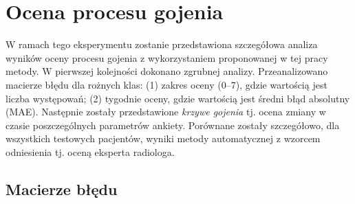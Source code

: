 \section{Ocena procesu gojenia}

W ramach tego eksperymentu zostanie przedstawiona szczegółowa analiza wyników oceny procesu gojenia z wykorzystaniem proponowanej w tej pracy metody. W pierwszej kolejności dokonano zgrubnej analizy. Przeanalizowano macierze błędu dla rożnych klas: (1) zakres oceny (0--7), gdzie wartością jest liczba występowań; (2) tygodnie oceny, gdzie wartością jest średni błąd absolutny (MAE). Następnie zostały przedstawione \textit{krzywe gojenia} tj. ocena zmiany w czasie poszczególnych parametrów ankiety. Porównane zostały szczegółowo, dla wszystkich testowych pacjentów, wyniki metody automatycznej z wzorcem odniesienia tj. oceną eksperta radiologa.

\subsection{Macierze błędu}

